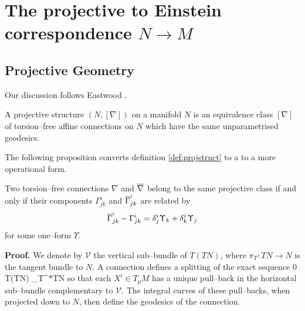 
\chapter{The projective to Einstein correspondence $N\rightarrow M$}
\label{chap:intro2}

\section{Projective Geometry}\label{sec:projgeom}

Our discussion follows Eastwood \cite{Eastwood}.

\begin{defi}\label{def:projstruct} A projective structure $(N,[\nabla])$
on a manifold $N$ is an equivalence class $[\nabla]$ of torsion--free affine connections on $N$ which have the same unparametrised geodesics.
\end{defi}

The following proposition converts definition \ref{def:projstruct} to a to a more operational form.

\begin{prop} Two torsion--free connections $\nabla$ and $\overline{\nabla}$ belong to the same projective class if and only if their components $\Gamma^i_{jk}$ and $\overline{\Gamma}^i_{jk}$ are related by
\begin{equation}
\overline{\Gamma}^i_{jk} - \Gamma^i_{jk} = \delta_{j}^{i}\Upsilon_{k}+\delta_{k}^{i}\Upsilon_{j}\label{eq:proj_change}
\end{equation}
for some one--form $\Upsilon.$
\end{prop}

{\bf Proof.} We denote by $\mathcal{V}$ the vertical sub--bundle of $T(TN)$, where $\pi_T:TN\rightarrow N$ is the tangent bundle to $N$. A connection defines a splitting of the exact sequence
\be \label{eq:TTMsequence}
0 \longrightarrow {} \longrightarrow T(TN) \longrightarrow \pi_T^*TN 
\ee
so that each $X^i\in T_pM$ has a unique pull--back in the horizontal sub--bundle complementary to $\mathcal{V}$. The integral curves of these pull--backs, when projected down to $N$, then define the geodesics of the connection.

